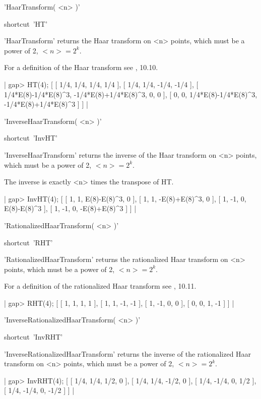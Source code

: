 'HaarTransform( <n> )'

shortcut\:\ 'HT'

'HaarTransform' returns the Haar transform on <n> points, 
which must be a power of 2, $<n> = 2^k$.

For a definition of the Haar transform see \cite{ER82}, 10.10.

|    gap> HT(4);
    [ [ 1/4, 1/4, 1/4, 1/4 ], [ 1/4, 1/4, -1/4, -1/4 ], 
      [ 1/4*E(8)-1/4*E(8)^3, -1/4*E(8)+1/4*E(8)^3, 0, 0 ], 
      [ 0, 0, 1/4*E(8)-1/4*E(8)^3, -1/4*E(8)+1/4*E(8)^3 ] ] |


'InverseHaarTransform( <n> )'

shortcut\:\ 'InvHT'

'InverseHaarTransform' returns the inverse of the 
Haar transform on <n> points, 
which must be a power of 2, $<n> = 2^k$.

The inverse is exactly <n> times the transpose of HT.

|    gap> InvHT(4);  
    [ [ 1, 1, E(8)-E(8)^3, 0 ], [ 1, 1, -E(8)+E(8)^3, 0 ], 
      [ 1, -1, 0, E(8)-E(8)^3 ], [ 1, -1, 0, -E(8)+E(8)^3 ] ] |


'RationalizedHaarTransform( <n> )'

shortcut\:\ 'RHT'

'RationalizedHaarTransform' returns the rationalized 
Haar transform on <n> points, 
which must be a power of 2, $<n> = 2^k$.

For a definition of the rationalized Haar transform 
see \cite{ER82}, 10.11.

|    gap> RHT(4);
    [ [ 1, 1, 1, 1 ], [ 1, 1, -1, -1 ], 
      [ 1, -1, 0, 0 ], [ 0, 0, 1, -1 ] ] |


'InverseRationalizedHaarTransform( <n> )'

shortcut\:\ 'InvRHT'

'InverseRationalizedHaarTransform' returns the inverse of the 
rationalized Haar transform on <n> points, 
which must be a power of 2, $<n> = 2^k$.

|    gap> InvRHT(4);
    [ [ 1/4, 1/4, 1/2, 0 ], [ 1/4, 1/4, -1/2, 0 ], 
      [ 1/4, -1/4, 0, 1/2 ], [ 1/4, -1/4, 0, -1/2 ] ] |

